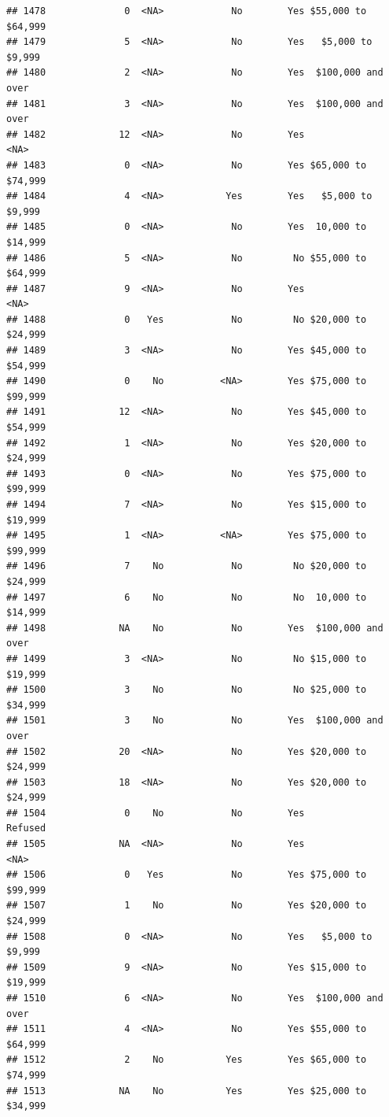 \documentclass[man]{apa6}
\begin{document}
\begin{verbatim}
## 1478              0  <NA>            No        Yes $55,000 to $64,999
## 1479              5  <NA>            No        Yes   $5,000 to $9,999
## 1480              2  <NA>            No        Yes  $100,000 and over
## 1481              3  <NA>            No        Yes  $100,000 and over
## 1482             12  <NA>            No        Yes               <NA>
## 1483              0  <NA>            No        Yes $65,000 to $74,999
## 1484              4  <NA>           Yes        Yes   $5,000 to $9,999
## 1485              0  <NA>            No        Yes  10,000 to $14,999
## 1486              5  <NA>            No         No $55,000 to $64,999
## 1487              9  <NA>            No        Yes               <NA>
## 1488              0   Yes            No         No $20,000 to $24,999
## 1489              3  <NA>            No        Yes $45,000 to $54,999
## 1490              0    No          <NA>        Yes $75,000 to $99,999
## 1491             12  <NA>            No        Yes $45,000 to $54,999
## 1492              1  <NA>            No        Yes $20,000 to $24,999
## 1493              0  <NA>            No        Yes $75,000 to $99,999
## 1494              7  <NA>            No        Yes $15,000 to $19,999
## 1495              1  <NA>          <NA>        Yes $75,000 to $99,999
## 1496              7    No            No         No $20,000 to $24,999
## 1497              6    No            No         No  10,000 to $14,999
## 1498             NA    No            No        Yes  $100,000 and over
## 1499              3  <NA>            No         No $15,000 to $19,999
## 1500              3    No            No         No $25,000 to $34,999
## 1501              3    No            No        Yes  $100,000 and over
## 1502             20  <NA>            No        Yes $20,000 to $24,999
## 1503             18  <NA>            No        Yes $20,000 to $24,999
## 1504              0    No            No        Yes            Refused
## 1505             NA  <NA>            No        Yes               <NA>
## 1506              0   Yes            No        Yes $75,000 to $99,999
## 1507              1    No            No        Yes $20,000 to $24,999
## 1508              0  <NA>            No        Yes   $5,000 to $9,999
## 1509              9  <NA>            No        Yes $15,000 to $19,999
## 1510              6  <NA>            No        Yes  $100,000 and over
## 1511              4  <NA>            No        Yes $55,000 to $64,999
## 1512              2    No           Yes        Yes $65,000 to $74,999
## 1513             NA    No           Yes        Yes $25,000 to $34,999

\end{verbatim}
\end{document}
